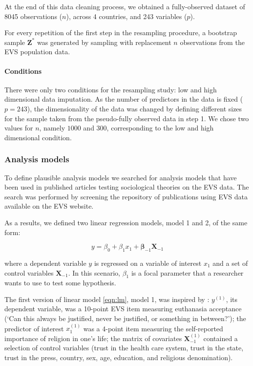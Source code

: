 	At the end of this data cleaning process, we obtained a fully-observed dataset
	of 8045 observations ($n$), across 4 countries, and 243 variables ($p$).
	
	For every repetition of the first step in the resampling procedure, a bootstrap sample $\bm{Z}^{*}$ was 
	generated by sampling with replacement $n$ observations from the EVS population data.

	\paragraph{Conditions}
	There were only two conditions for the resampling study: low and high dimensional data imputation.
	As the number of predictors in the data is fixed ($p = 243$), the dimensionality of the data was 
	changed by defining different sizes for the sample taken from the pseudo-fully observed data in
	step 1.
	We chose two values for $n$, namely $1000$ and $300$, corresponding to the low and high 
	dimensional condition.

\subsubsection{Analysis models}

	To define plausible analysis models we searched for analysis models that have been used in published articles
	testing sociological theories on the EVS data.
	The search was performed by screening the repository of publications using EVS data available on the EVS website.

	As a results, we defined two linear regression models, model 1 and 2, of the same form:
	
	\begin{equation}
		y = \beta_{0} + \beta_{1} x_{1} + \bm{\beta}_{-1} \bm{X}_{-1}  \label{eqn:lm}
	\end{equation}
	
	where a dependent variable $y$ is regressed on a variable of interest $x_{1}$ and a set of control variables
	$\bm{X}_{-1}$.
	In this scenario, $\beta_{1}$ is a focal parameter that a researcher wants to use to test some hypothesis.

	The first version of linear model \ref{eqn:lm}, model 1, was inspired by \cite{koneke:2014}:
	$y^{(1)}$, its dependent variable, was a 10-point EVS item measuring euthanasia acceptance 
	(`Can this always be justified, never be justified, or something in between?');
	the predictor of interest $x^{(1)}_{1}$ was a 4-point item measuring the self-reported importance of religion in 
	one's life;
	the matrix of covariates $\bm{X}^{(1)}_{-1}$ contained a selection of control variables
	(trust in the health care system, trust in the state, trust in the press,
	country, sex, age, education, and religious denomination).

